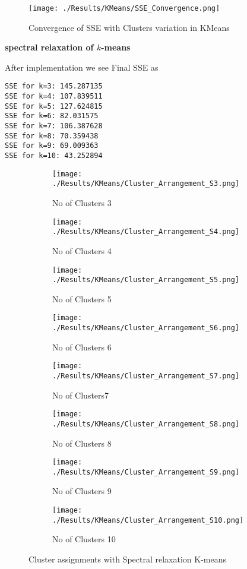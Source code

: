 \documentclass[11pt]{article}
\begin{document}
\begin{figure}[htbp]
	\centering
	\texttt{[image: ./Results/KMeans/SSE\_Convergence.png]}
	\caption{Convergence of SSE with Clusters variation in KMeans}
	\label{fig:SSEconvergence}
\end{figure}

\textbf{ spectral relaxation of $k$-means}


After implementation we see Final SSE as

\begin{verbatim}
SSE for k=3: 145.287135
SSE for k=4: 107.839511
SSE for k=5: 127.624815
SSE for k=6: 82.031575
SSE for k=7: 106.387628
SSE for k=8: 70.359438
SSE for k=9: 69.009363
SSE for k=10: 43.252894
\end{verbatim} 

\begin{figure}[htbp]
	\centering
	\begin{subfigure}[b]{0.3\textwidth}
		\texttt{[image: ./Results/KMeans/Cluster\_Arrangement\_S3.png]}
		\caption{No of Clusters 3}
		\label{fig:cluster3}
	\end{subfigure}
	\begin{subfigure}[b]{0.3\textwidth}
		\texttt{[image: ./Results/KMeans/Cluster\_Arrangement\_S4.png]}
		\caption{No of Clusters 4}
		\label{fig:cluster4}
	\end{subfigure}
	\begin{subfigure}[b]{0.3\textwidth}
		\texttt{[image: ./Results/KMeans/Cluster\_Arrangement\_S5.png]}
		\caption{No of Clusters 5}
		\label{fig:cluster5}
	\end{subfigure}
	
	\begin{subfigure}[b]{0.3\textwidth}
		\texttt{[image: ./Results/KMeans/Cluster\_Arrangement\_S6.png]}
		\caption{No of Clusters 6}
		\label{fig:cluster6}
	\end{subfigure}
	\begin{subfigure}[b]{0.3\textwidth}
		\texttt{[image: ./Results/KMeans/Cluster\_Arrangement\_S7.png]}
		\caption{No of Clusters7}
		\label{fig:cluster7}
	\end{subfigure}
	\begin{subfigure}[b]{0.3\textwidth}
		\texttt{[image: ./Results/KMeans/Cluster\_Arrangement\_S8.png]}
		\caption{No of Clusters 8}
		\label{fig:cluster8}
	\end{subfigure}
	
	\begin{subfigure}[b]{0.3\textwidth}
		\texttt{[image: ./Results/KMeans/Cluster\_Arrangement\_S9.png]}
		\caption{No of Clusters 9}
		\label{fig:cluster9}
	\end{subfigure}
	\begin{subfigure}[b]{0.3\textwidth}
		\texttt{[image: ./Results/KMeans/Cluster\_Arrangement\_S10.png]}
		\caption{No of Clusters 10}
		\label{fig:cluster10}
	\end{subfigure}
	\caption{Cluster assignments with Spectral relaxation K-means}
	\label{fig:clusterassignments}
\end{figure}
\end{document}
